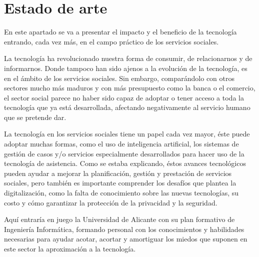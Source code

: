 
\chapter{Estado de arte}
En este apartado se va a presentar el impacto y el beneficio de la tecnología entrando, cada vez más, en el campo práctico de los servicios sociales.
\vspace{1em}
\par La tecnología ha revolucionado nuestra forma de consumir, de relacionarnos y de informarnos. Donde tampoco han sido ajenos a la evolución de la tecnología, es en el ámbito de los servicios sociales. Sin embargo, comparándolo con otros sectores mucho más maduros y con más presupuesto como la banca o el comercio, el sector social parece no haber sido capaz de adoptar o tener acceso a toda la tecnología que ya está desarrollada, afectando negativamente al servicio humano que se pretende dar.
\vspace{1em}
\par La tecnología en los servicios sociales tiene un papel cada vez mayor, éste puede adoptar muchas formas, como el uso de inteligencia artificial, los sistemas de gestión de casos y/o servicios especialmente desarrollados para hacer uso de la tecnología de asistencia. Como se estaba explicando, éstos avances tecnológicos pueden ayudar a mejorar la planificación, gestión y prestación de servicios sociales, pero también es importante comprender los desafíos que plantea la digitalización, como la falta de conocimiento sobre las nuevas tecnologías, su costo y cómo garantizar la protección de la privacidad y la seguridad.
\vspace{1em}
\par Aquí entraría en juego la Universidad de Alicante con su plan formativo de Ingeniería Informática, formando personal con los conocimientos y habilidades necesarias para ayudar acotar, acortar y amortiguar los miedos que suponen en este sector la aproximación a la tecnología.

